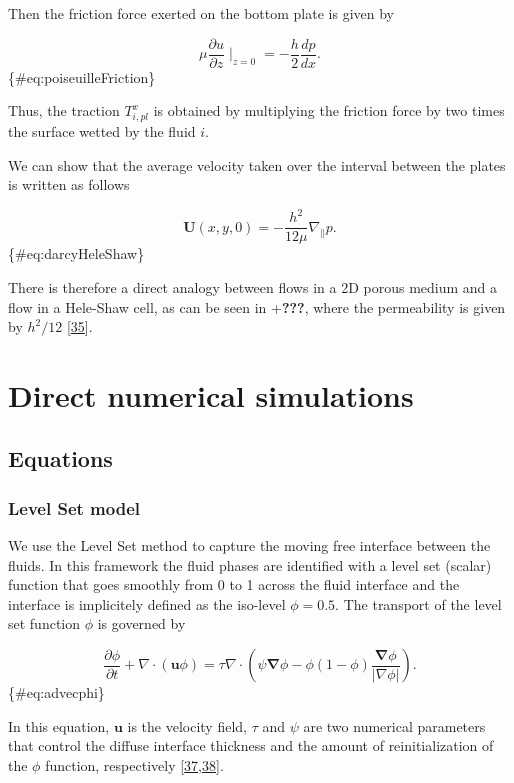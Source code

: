 \documentclass[]{article}
\begin{document}
Then the friction force exerted on the bottom plate is given by

\[
\mu\frac{\partial u}{\partial z}\mid_{z=0}=-\frac{h}{2}\frac{dp}{dx}.
\] \{\#eq:poiseuilleFriction\}

Thus, the traction \(T_{i,pl}^x\) is obtained by multiplying the
friction force by two times the surface wetted by the fluid \(i\).

We can show that the average velocity taken over the interval between
the plates is written as follows

\[
\mathbf{U}(x,y,0)=-\frac{h^{2}}{12\mu}\nabla_{\parallel}p.
\] \{\#eq:darcyHeleShaw\}

There is therefore a direct analogy between flows in a 2D porous medium
and a flow in a Hele-Shaw cell, as can be seen in +\textbf{???}, where
the permeability is given by \(h^{2}/12\)
{[}\protect\hyperlink{ref-saffman1958penetration}{35}{]}.

\hypertarget{direct-numerical-simulations}{%
\section{Direct numerical
simulations}\label{direct-numerical-simulations}}

\hypertarget{equations}{%
\subsection{Equations}\label{equations}}

\hypertarget{level-set-model}{%
\subsubsection{Level Set model}\label{level-set-model}}

We use the Level Set method to capture the moving free interface between
the fluids. In this framework the fluid phases are identified with a
level set (scalar) function that goes smoothly from 0 to 1 across the
fluid interface and the interface is implicitely defined as the
iso-level \(\phi=0.5\). The transport of the level set function \(\phi\)
is governed by

\[
\frac{\partial\phi}{\partial t}+\nabla\cdot(\mathbf{u}\phi)=\tau\nabla\cdot\left(\psi\boldsymbol{\nabla}\phi-\phi(1-\phi)\frac{\boldsymbol{\nabla}\phi}{\vert\nabla\phi\vert}\right).
\] \{\#eq:advecphi\}

In this equation, \(\mathbf{u}\) is the velocity field, \(\tau\) and
\(\psi\) are two numerical parameters that control the diffuse interface
thickness and the amount of reinitialization of the \(\phi\) function,
respectively
{[}\protect\hyperlink{ref-Olsson2005}{37},\protect\hyperlink{ref-Olsson2007}{38}{]}.
\end{document}
